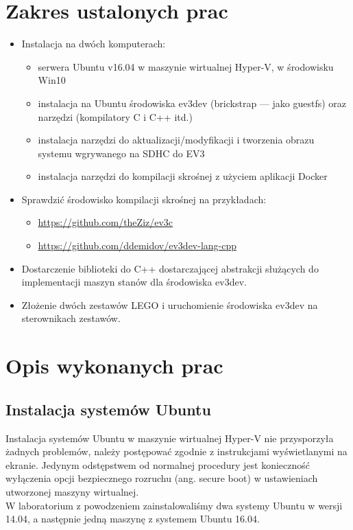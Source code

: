 \documentclass{article}
\begin{document}
\section{Zakres ustalonych prac}\label{prace_ustalone}
\begin{itemize}
    \item Instalacja na dwóch komputerach:
        \begin{itemize}
            \item serwera Ubuntu v16.04 w maszynie wirtualnej Hyper-V, w środowisku Win10
            \item instalacja na Ubuntu środowiska ev3dev (brickstrap --- jako guestfs) oraz narzędzi (kompilatory C i C++ itd.)
            \item instalacja narzędzi do aktualizacji/modyfikacji i tworzenia obrazu systemu wgrywanego na SDHC do EV3
            \item instalacja narzędzi do kompilacji skrośnej z użyciem aplikacji Docker
        \end{itemize}
    \item Sprawdzić środowisko kompilacji skrośnej na przykładach:
        \begin{itemize}
            \item \url{https://github.com/theZiz/ev3c}
            \item \url{https://github.com/ddemidov/ev3dev-lang-cpp}
        \end{itemize}
    \item Dostarczenie biblioteki do C++ dostarczającej abstrakcji służących do
        implementacji maszyn stanów dla środowiska ev3dev.
    \item Złożenie dwóch zestawów LEGO i uruchomienie środowiska ev3dev na
        sterownikach zestawów.
\end{itemize}
\section{Opis wykonanych prac}\label{prace_wykonane}
\subsection{Instalacja systemów Ubuntu}
Instalacja systemów Ubuntu w maszynie wirtualnej Hyper-V nie przysporzyła
żadnych problemów, należy postępować zgodnie z instrukcjami wyświetlanymi na
ekranie.
Jedynym odstępstwem od normalnej procedury jest konieczność
wyłączenia opcji bezpiecznego rozruchu (ang. secure boot)
w ustawieniach utworzonej maszyny wirtualnej.\\
W laboratorium z powodzeniem zainstalowaliśmy dwa systemy Ubuntu w wersji 14.04, a następnie
jedną maszynę z systemem Ubuntu 16.04.
\end{document}
